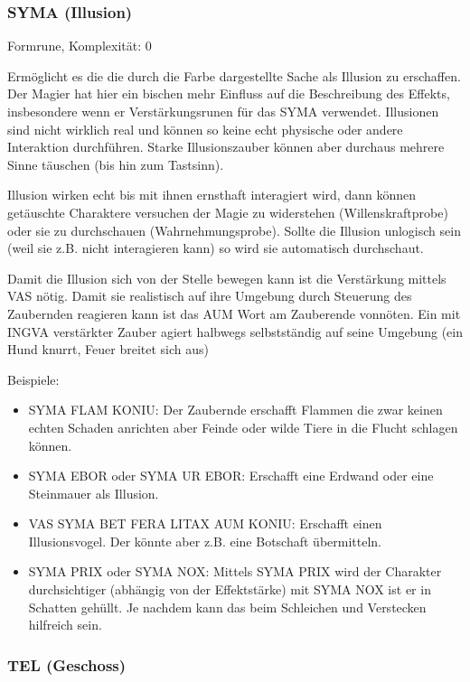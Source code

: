 \documentclass{article}
\begin{document}
\subsubsection{SYMA (Illusion)}

Formrune, Komplexität: 0

Ermöglicht es die die durch die Farbe dargestellte Sache als Illusion zu erschaffen. Der Magier hat hier ein bischen
mehr Einfluss auf die Beschreibung des Effekts, insbesondere wenn er Verstärkungsrunen für das SYMA verwendet.
Illusionen sind nicht wirklich real und können so keine echt physische oder andere Interaktion durchführen. Starke
Illusionszauber können aber durchaus mehrere Sinne täuschen (bis hin zum Tastsinn).

Illusion wirken echt bis mit ihnen ernsthaft interagiert wird, dann können getäuschte Charaktere versuchen der Magie
zu widerstehen (Willenskraftprobe) oder sie zu durchschauen (Wahrnehmungsprobe). Sollte die Illusion unlogisch sein
(weil sie z.B. nicht interagieren kann) so wird sie automatisch durchschaut.

Damit die Illusion sich von der Stelle bewegen kann ist die Verstärkung mittels VAS nötig. Damit sie realistisch auf
ihre Umgebung durch Steuerung des Zaubernden reagieren kann ist das AUM Wort am Zauberende vonnöten. Ein mit INGVA
verstärkter Zauber agiert halbwegs selbstständig auf seine Umgebung (ein Hund knurrt, Feuer breitet sich aus)

Beispiele:

\begin{itemize}
\item SYMA FLAM KONIU: Der Zaubernde erschafft Flammen die zwar keinen echten Schaden anrichten aber Feinde oder wilde Tiere in die Flucht schlagen können.
\item SYMA EBOR oder SYMA UR EBOR: Erschafft eine Erdwand oder eine Steinmauer als Illusion.
\item VAS SYMA BET FERA LITAX AUM KONIU: Erschafft einen Illusionsvogel. Der könnte aber z.B. eine Botschaft übermitteln.
\item SYMA PRIX oder SYMA NOX: Mittels SYMA PRIX wird der Charakter durchsichtiger (abhängig von der Effektstärke) mit SYMA NOX ist er in Schatten gehüllt. Je nachdem kann das beim Schleichen und Verstecken hilfreich sein.
\end{itemize}

\subsubsection{TEL (Geschoss)}
\end{document}
